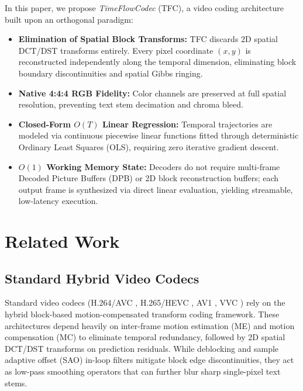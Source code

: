 \documentclass[conference]{IEEEtran}
\begin{document}
In this paper, we propose \textit{TimeFlowCodec} (TFC), a video coding architecture built upon an orthogonal paradigm:
\begin{itemize}
    \item \textbf{Elimination of Spatial Block Transforms:} TFC discards 2D spatial DCT/DST transforms entirely. Every pixel coordinate $(x, y)$ is reconstructed independently along the temporal dimension, eliminating block boundary discontinuities and spatial Gibbs ringing.
    \item \textbf{Native 4:4:4 RGB Fidelity:} Color channels are preserved at full spatial resolution, preventing text stem decimation and chroma bleed.
    \item \textbf{Closed-Form $O(T)$ Linear Regression:} Temporal trajectories are modeled via continuous piecewise linear functions fitted through deterministic Ordinary Least Squares (OLS), requiring zero iterative gradient descent.
    \item \textbf{$O(1)$ Working Memory State:} Decoders do not require multi-frame Decoded Picture Buffers (DPB) or 2D block reconstruction buffers; each output frame is synthesized via direct linear evaluation, yielding streamable, low-latency execution.
\end{itemize}

\section{Related Work}

\subsection{Standard Hybrid Video Codecs}
Standard video codecs (H.264/AVC \cite{wiegand2003overview}, H.265/HEVC \cite{sullivan2012overview}, AV1 \cite{chen2020overview}, VVC \cite{bross2021overview}) rely on the hybrid block-based motion-compensated transform coding framework. These architectures depend heavily on inter-frame motion estimation (ME) and motion compensation (MC) to eliminate temporal redundancy, followed by 2D spatial DCT/DST transforms on prediction residuals. While deblocking and sample adaptive offset (SAO) in-loop filters mitigate block edge discontinuities, they act as low-pass smoothing operators that can further blur sharp single-pixel text stems.
\end{document}
